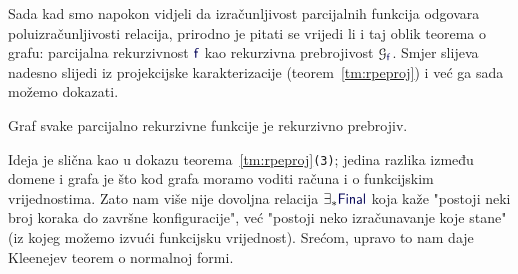 Sada kad smo napokon vidjeli da izračunljivost parcijalnih funkcija odgovara poluizračunljivosti relacija, prirodno je pitati se vrijedi li i taj oblik teorema o grafu: parcijalna rekurzivnost $\f f$ kao rekurzivna prebrojivost $\graf{\f f}$. Smjer slijeva nadesno slijedi iz projekcijske karakterizacije (teorem~\ref{tm:rpeproj}) i već ga sada možemo dokazati.

\begin{teorem}[{name=[rekurzivna prebrojivost grafova parcijalno rekurzivnih funkcija]}]\label{tm:grafprre}
Graf svake parcijalno rekurzivne funkcije je rekurzivno prebrojiv.
\end{teorem}

Ideja je slična kao u dokazu teorema~\ref{tm:rpeproj}\texttt{(3)}; jedina razlika između domene i grafa je što kod grafa moramo voditi računa i o funkcijskim vrijednostima. Zato nam više nije dovoljna relacija $\exists_*\f{Final}$ koja kaže "postoji neki broj koraka do završne konfiguracije", već "postoji neko izračunavanje koje stane" (iz kojeg možemo izvući funkcijsku vrijednost). Srećom, upravo to nam daje Kleenejev teorem o normalnoj formi.

